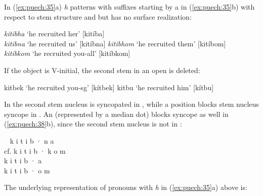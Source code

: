 \documentclass[output=paper]{langsci/langscibook}
\begin{document}
In (\ref{ex:puech:35}a) \textit{h} patterns with suffixes starting by a  in (\ref{ex:puech:35}b) with respect to stem structure and  but has no surface realization:

\ea\label{ex:puech:36}
  \ea%
      \textit{kitibha} ‘he recruited her’  [kitíba]\\
       \textit{kitibna} ‘he recruited us’  [kitíbna]
  \ex%
      \textit{kitibhom}  ‘he recruited them’  [kitíbom]\\
      \textit{kitibkom}  ‘he recruited you-all’  [kitíbkom]
  \z
\z

If the object  is V-initial, the second stem  in an open  is deleted:

\ea\label{ex:puech:37}
\ea%
kitbek  ‘he recruited you-sg’  [kítbek]
\ex%
kitbu  ‘he recruited him’  [kítbu]
\z
\z

In  the second stem nucleus is syncopated in , while a  position blocks stem nucleus syncope in . An  (represented by a median dot) blocks syncope as well in (\ref{ex:puech:38}b), since the second stem nucleus is not in :

\ea\label{ex:puech:38}%
\ea
\gll ~ k  i  t  i  b  ·  n  a          \\
     cf. k  i  t  i  b  ·  k  o  m  \\
\ex
\gll k  i  t  i  b  ·  a\\
      k  i  t  i  b  ·  o  m\\
\z      
\z

The underlying representation of pronouns with \textit{h} in (\ref{ex:puech:35}a) above is:

\end{document}
